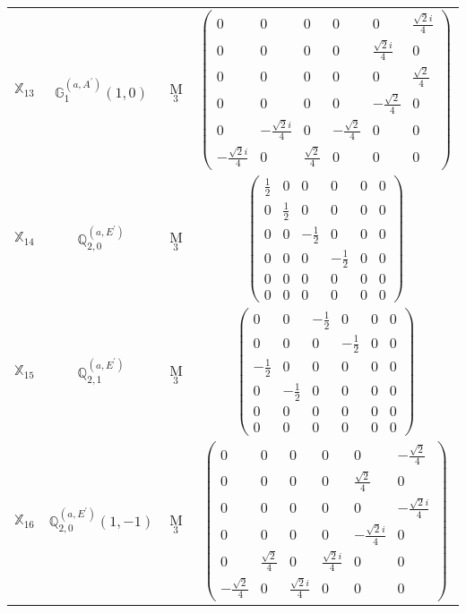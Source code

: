 \documentclass[fleqn,10pt,landscape]{article}
\begin{document}
\begin{itemize}
\begin{center}
\begin{longtable}{c|c|c|c}
$ \mathbb{X}_{13} $ & $\mathbb{G}_{1}^{(a,A^{\prime})}(1,0)$ & M$_{3}$ & $\begin{pmatrix} 0 & 0 & 0 & 0 & 0 & \frac{\sqrt{2} i}{4} \\ 0 & 0 & 0 & 0 & \frac{\sqrt{2} i}{4} & 0 \\ 0 & 0 & 0 & 0 & 0 & \frac{\sqrt{2}}{4} \\ 0 & 0 & 0 & 0 & - \frac{\sqrt{2}}{4} & 0 \\ 0 & - \frac{\sqrt{2} i}{4} & 0 & - \frac{\sqrt{2}}{4} & 0 & 0 \\ - \frac{\sqrt{2} i}{4} & 0 & \frac{\sqrt{2}}{4} & 0 & 0 & 0 \end{pmatrix}$ \\
$ \mathbb{X}_{14} $ & $\mathbb{Q}_{2,0}^{(a,E^{\prime})}$ & M$_{3}$ & $\begin{pmatrix} \frac{1}{2} & 0 & 0 & 0 & 0 & 0 \\ 0 & \frac{1}{2} & 0 & 0 & 0 & 0 \\ 0 & 0 & - \frac{1}{2} & 0 & 0 & 0 \\ 0 & 0 & 0 & - \frac{1}{2} & 0 & 0 \\ 0 & 0 & 0 & 0 & 0 & 0 \\ 0 & 0 & 0 & 0 & 0 & 0 \end{pmatrix}$ \\
$ \mathbb{X}_{15} $ & $\mathbb{Q}_{2,1}^{(a,E^{\prime})}$ & M$_{3}$ & $\begin{pmatrix} 0 & 0 & - \frac{1}{2} & 0 & 0 & 0 \\ 0 & 0 & 0 & - \frac{1}{2} & 0 & 0 \\ - \frac{1}{2} & 0 & 0 & 0 & 0 & 0 \\ 0 & - \frac{1}{2} & 0 & 0 & 0 & 0 \\ 0 & 0 & 0 & 0 & 0 & 0 \\ 0 & 0 & 0 & 0 & 0 & 0 \end{pmatrix}$ \\
$ \mathbb{X}_{16} $ & $\mathbb{Q}_{2,0}^{(a,E^{\prime})}(1,-1)$ & M$_{3}$ & $\begin{pmatrix} 0 & 0 & 0 & 0 & 0 & - \frac{\sqrt{2}}{4} \\ 0 & 0 & 0 & 0 & \frac{\sqrt{2}}{4} & 0 \\ 0 & 0 & 0 & 0 & 0 & - \frac{\sqrt{2} i}{4} \\ 0 & 0 & 0 & 0 & - \frac{\sqrt{2} i}{4} & 0 \\ 0 & \frac{\sqrt{2}}{4} & 0 & \frac{\sqrt{2} i}{4} & 0 & 0 \\ - \frac{\sqrt{2}}{4} & 0 & \frac{\sqrt{2} i}{4} & 0 & 0 & 0 \end{pmatrix}$ \\

\end{longtable}
\end{center}
\end{itemize}
\end{document}
